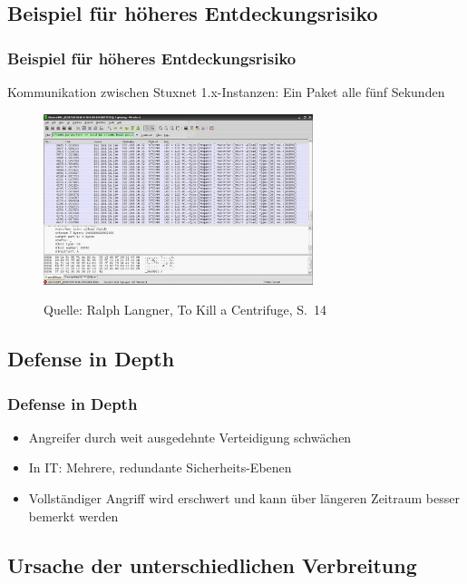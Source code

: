 \documentclass{beamer}
\begin{document}
\subsection{Beispiel für höheres Entdeckungsrisiko}

\begin{frame}
  \frametitle{Beispiel für höheres Entdeckungsrisiko}
  \centering\small{Kommunikation zwischen Stuxnet 1.x-Instanzen: Ein Paket alle fünf Sekunden}
  \begin{figure}[p]
    \centering
    \includegraphics[width=0.7\textwidth]{../Wireshark.png}
    
    \tiny{Quelle: Ralph Langner, To Kill a Centrifuge, S.~14}
  \end{figure}
\end{frame}

\subsection{Defense in Depth}

\begin{frame}
  \frametitle{Defense in Depth}
  \begin{itemize}
    \item Angreifer durch weit ausgedehnte Verteidigung schwächen
    \item In IT: Mehrere, redundante Sicherheits-Ebenen
    \item Vollständiger Angriff wird erschwert und kann über längeren Zeitraum besser bemerkt werden
  \end{itemize}
\end{frame}

\subsection{Ursache der unterschiedlichen Verbreitung}
\end{document}
